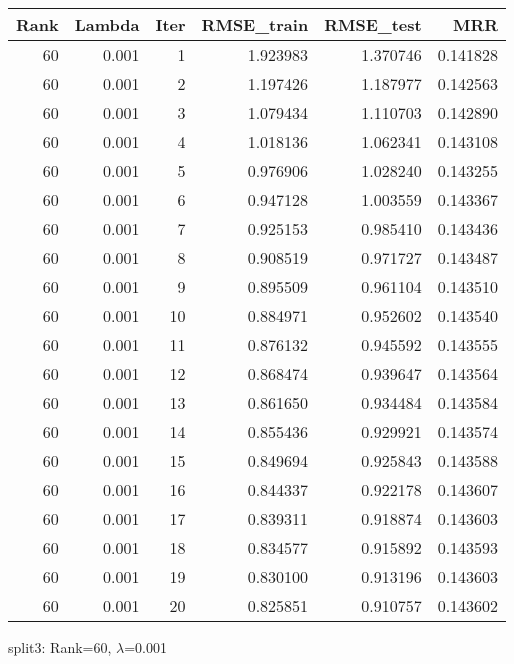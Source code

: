 \begin{tabular}{rrrrrr}
\toprule
 Rank &  Lambda &  Iter &  RMSE\_train &  RMSE\_test &       MRR \\
\midrule
   60 &   0.001 &     1 &    1.923983 &   1.370746 &  0.141828 \\
   60 &   0.001 &     2 &    1.197426 &   1.187977 &  0.142563 \\
   60 &   0.001 &     3 &    1.079434 &   1.110703 &  0.142890 \\
   60 &   0.001 &     4 &    1.018136 &   1.062341 &  0.143108 \\
   60 &   0.001 &     5 &    0.976906 &   1.028240 &  0.143255 \\
   60 &   0.001 &     6 &    0.947128 &   1.003559 &  0.143367 \\
   60 &   0.001 &     7 &    0.925153 &   0.985410 &  0.143436 \\
   60 &   0.001 &     8 &    0.908519 &   0.971727 &  0.143487 \\
   60 &   0.001 &     9 &    0.895509 &   0.961104 &  0.143510 \\
   60 &   0.001 &    10 &    0.884971 &   0.952602 &  0.143540 \\
   60 &   0.001 &    11 &    0.876132 &   0.945592 &  0.143555 \\
   60 &   0.001 &    12 &    0.868474 &   0.939647 &  0.143564 \\
   60 &   0.001 &    13 &    0.861650 &   0.934484 &  0.143584 \\
   60 &   0.001 &    14 &    0.855436 &   0.929921 &  0.143574 \\
   60 &   0.001 &    15 &    0.849694 &   0.925843 &  0.143588 \\
   60 &   0.001 &    16 &    0.844337 &   0.922178 &  0.143607 \\
   60 &   0.001 &    17 &    0.839311 &   0.918874 &  0.143603 \\
   60 &   0.001 &    18 &    0.834577 &   0.915892 &  0.143593 \\
   60 &   0.001 &    19 &    0.830100 &   0.913196 &  0.143603 \\
   60 &   0.001 &    20 &    0.825851 &   0.910757 &  0.143602 \\
\bottomrule
\end{tabular}

\caption{split3: Rank=60, $\lambda$=0.001}
